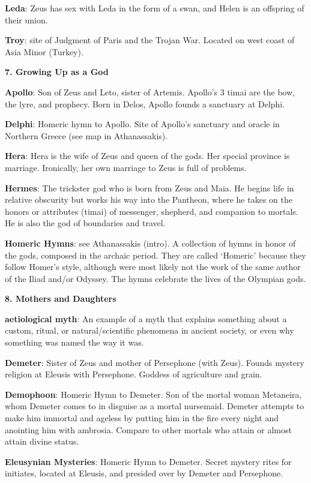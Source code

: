 \documentclass{scrartcl}
\begin{document}
\begin{multicols*}{3}
{\bf Leda}: Zeus has sex with Leda in the form of a swan, and Helen is an offspring of their union.

{\bf Troy}: site of Judgment of Paris and the Trojan War. Located on west coast of Asia Minor (Turkey).


{\bf 7. Growing Up as a God}

{\bf Apollo}: Son of Zeus and Leto, sister of Artemis. Apollo's 3 timai are the bow, the lyre, and prophecy. Born in Delos, Apollo founds a sanctuary at Delphi.

{\bf Delphi}: Homeric hymn to Apollo. Site of Apollo's sanctuary and oracle in Northern Greece (see map in Athanassakis).

{\bf Hera}: Hera is the wife of Zeus and queen of the gods. Her special province is marriage. Ironically, her own marriage to Zeus is full of problems.

{\bf Hermes}: The trickster god who is born from Zeus and Maia. He begins life in relative obscurity but works his way into the Pantheon, where he takes on the honors or attributes (timai) of messenger, shepherd, and companion to mortals. He is also the god of boundaries and travel.

{\bf Homeric Hymns}: see Athanassakis (intro). A collection of hymns in honor of the gods, composed in the archaic period. They are called `Homeric' because they follow Homer's style, although were most likely not the work of the same author of the Iliad and/or Odyssey. The hymns celebrate the lives of the Olympian gods.


{\bf 8. Mothers and Daughters}

{\bf aetiological myth}: An example of a myth that explains something about a custom, ritual, or natural/scientific phenomena in ancient society, or even why something was named the way it was. 

{\bf Demeter}: Sister of Zeus and mother of Persephone (with Zeus). Founds mystery religion at Eleusis with Persephone. Goddess of agriculture and grain.

{\bf Demophoon}: Homeric Hymn to Demeter. Son of the mortal woman Metaneira, whom Demeter comes to in disguise as a mortal nursemaid. Demeter attempts to make him immortal and ageless by putting him in the fire every night and anointing him with ambrosia. Compare to other mortals who attain or almost attain divine status. 

{\bf Eleusynian Mysteries}: Homeric Hymn to Demeter. Secret mystery rites for initiates, located at Eleusis, and presided over by Demeter and Persephone.


\end{multicols*}
\end{document}
